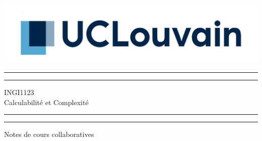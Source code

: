 \begin{titlepage} %

	\sffamily

   \hfill  \includegraphics[scale=0.3]{Images/UCLouvain_logo2.png}	
	
	\centering %
	
	
	\vspace*{3\baselineskip} %
	
	
	\rule{\textwidth}{1.6pt}\vspace*{-\baselineskip}\vspace*{2pt} %
	\rule{\textwidth}{0.4pt} %
	
	\vspace{0.75\baselineskip} %
	
	{\LARGE INGI1123 \\ Calculabilité et Complexité \\} %
	
	\vspace{0.75\baselineskip} %
	
	\rule{\textwidth}{0.4pt}\vspace*{-\baselineskip}\vspace{3.2pt} %
	\rule{\textwidth}{1.6pt} %
	
	\vspace{2\baselineskip} %
	
	
	{\large   Notes de cours collaboratives } %
	
	\vspace*{3\baselineskip} %
	

\end{titlepage}
